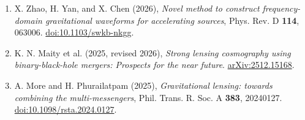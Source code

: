 \documentclass[11pt]{article}
\begin{document}
\begin{enumerate}[itemsep=7pt]
\item X. Zhao, H. Yan, and X. Chen (2026), \textit{Novel method to construct frequency-domain gravitational waveforms for accelerating sources}, Phys. Rev. D \textbf{114}, 063006. \href{https://doi.org/10.1103/swkb-nkgg}{doi:10.1103/swkb-nkgg}.
\item K. N. Maity et al. (2025, revised 2026), \textit{Strong lensing cosmography using binary-black-hole mergers: Prospects for the near future}. \href{https://arxiv.org/abs/2512.15168}{arXiv:2512.15168}.
\item A. More and H. Phurailatpam (2025), \textit{Gravitational lensing: towards combining the multi-messengers}, Phil. Trans. R. Soc. A \textbf{383}, 20240127. \href{https://doi.org/10.1098/rsta.2024.0127}{doi:10.1098/rsta.2024.0127}.
\end{enumerate}
\end{document}
